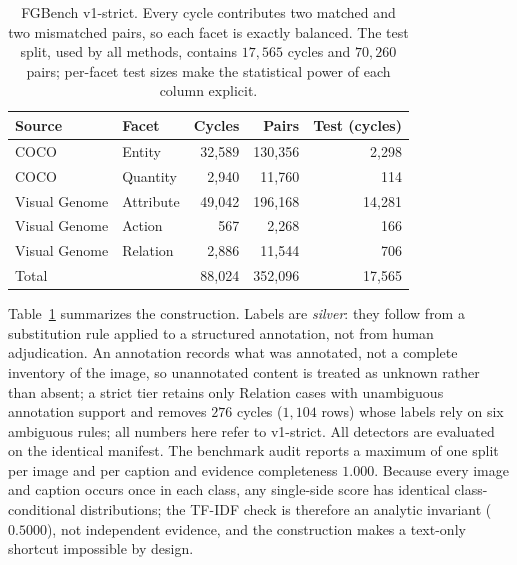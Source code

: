 \begin{table}[t]
\centering
\small
\setlength{\tabcolsep}{4pt}
\caption{FGBench v1-strict. Every cycle contributes two matched and two mismatched
pairs, so each facet is exactly balanced. The test split, used by all methods,
contains $17{,}565$ cycles and $70{,}260$ pairs; per-facet test sizes make the
statistical power of each column explicit.}
\label{tab:fgbench}
\begin{tabular}{llrrr}
\toprule
Source & Facet & Cycles & Pairs & Test (cycles) \\
\midrule
COCO          & Entity     & 32{,}589 & 130{,}356 &  2{,}298 \\
COCO          & Quantity   &  2{,}940 &  11{,}760 &    114 \\
Visual Genome & Attribute  & 49{,}042 & 196{,}168 & 14{,}281 \\
Visual Genome & Action     &    567   &   2{,}268 &    166 \\
Visual Genome & Relation   &  2{,}886 &  11{,}544 &    706 \\
\midrule
\multicolumn{2}{l}{Total}      & 88{,}024 & 352{,}096 & 17{,}565 \\
\bottomrule
\end{tabular}
\end{table}

Table~\ref{tab:fgbench} summarizes the construction. Labels are \emph{silver}: they
follow from a substitution rule applied to a structured annotation, not from human
adjudication. An annotation records what was
annotated, not a complete inventory of the image, so unannotated content is treated
as unknown rather than absent; a strict tier retains only Relation cases with
unambiguous annotation support and removes $276$ cycles ($1{,}104$ rows) whose labels
rely on six ambiguous rules; all numbers here refer to v1-strict. All detectors are
evaluated on the identical manifest. The benchmark audit reports a maximum of one
split per image and per caption and evidence completeness $1.000$. Because every
image and caption occurs once in each class, any single-side score has identical
class-conditional distributions; the TF-IDF check is therefore an analytic invariant
($0.5000$), not independent evidence, and the construction makes a text-only shortcut
impossible by design.
